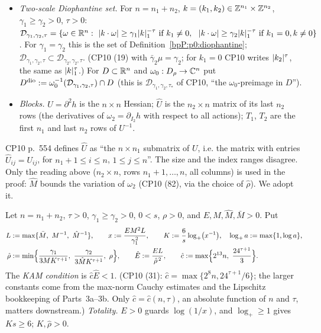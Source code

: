 \begin{itemize}
\item \emph{Two-scale Diophantine set.} For $n=n_1+n_2$, $k=(k_1,k_2)\in\mathbb{Z}^{n_1}\times\mathbb{Z}^{n_2}$, $\gamma_1\ge\gamma_2>0$, $\tau>0$:
  $\mathcal D_{\gamma_1,\gamma_2,\tau}=\{\omega\in\R^n:\ \abs{k\cdot\omega}\ge\gamma_1\abs k_1^{-\tau}\text{ if }k_1\ne0,\ \ \abs{k\cdot\omega}\ge\gamma_2\abs k_1^{-\tau}\text{ if }k_1=0,k\ne0\}$.
  For $\gamma_1=\gamma_2$ this is the set of Definition~\ref{bpP:p0:diophantine}; $\mathcal D_{\gamma_1,\gamma_2,\tau}\subset\mathcal D_{\gamma_2,\gamma_2,\tau}$.
  (CP10 (19) with $\bar\gamma_2\mu=\gamma_2$; for $k_1=0$ CP10 writes $\lvert k_2\rvert^{\tau}$, the same as $\lvert k\rvert_1^\tau$.)
  For $D\subset\mathbb{R}^n$ and $\omega_0:D_\rho\to\mathbb{C}^n$ put $D^{\rm dio}:=\omega_0^{-1}(\mathcal D_{\gamma_1,\gamma_2,\tau})\cap D$ (this is $\mathcal D_{\gamma_1,\gamma_2,\tau_*}$ of CP10, ``the $\omega_0$-preimage in $D$'').
\item \emph{Blocks.} $U=\partial^2h$ is the $n\times n$ Hessian; $\hat U$ is the $n_2\times n$ matrix of its last $n_2$ rows (the derivatives of $\omega_2=\partial_{I_2}h$ with
  respect to all actions); $T_1$, $T_2$ are the first $n_1$ and last $n_2$ rows of $U^{-1}$.
\end{itemize}

\begin{remark}\label{bpP:p3:rem-uhat}
CP10 p.~554 defines $\hat U$ as ``the $n\times n_1$ submatrix of $U$, i.e. the matrix with entries $\hat U_{ij}=U_{ij}$, for $n_1+1\le i\le n$, $1\le j\le n$''.
The size and the index ranges disagree. Only the reading above ($n_2\times n$, rows $n_1+1,\dots,n$, all columns) is used in the proof: $\hat M$ bounds the variation
of $\omega_2$ (CP10 (82), via the choice of $\hat\rho$). We adopt it.
\end{remark}

\begin{definition}\label{bpP:p3:constants}
Let $n=n_1+n_2$, $\tau>0$, $\gamma_1\ge\gamma_2>0$, $0<s$, $\rho>0$, and $E,M,\hat M,\bar M>0$. Put
\begin{align*}
L&:=\max\{\bar M,\ M^{-1},\ \hat M^{-1}\},\qquad x:=\frac{EM^2L}{\gamma_1^2},\qquad
K:=\frac6s\log_+\bigl(x^{-1}\bigr),\quad\log_+a:=\max\{1,\log a\},\\
\hat\rho&:=\min\Bigl\{\frac{\gamma_1}{3MK^{\tau+1}},\ \frac{\gamma_2}{3\hat MK^{\tau+1}},\ \rho\Bigr\},\qquad
\hat E:=\frac{EL}{\hat\rho^{\,2}},\qquad
\hat c:=\max\Bigl\{2^{13}n,\ \frac{24^{\tau+1}}3\Bigr\}.
\end{align*}
The \emph{KAM condition} is $\hat c\hat E<1$. (CP10 (31): $\hat c=\max\{2^8n,24^{\tau+1}/6\}$; the larger constants come from the max-norm
Cauchy estimates and the Lipschitz bookkeeping of Parts~3a--3b. Only $\hat c=\hat c(n,\tau)$, an absolute function of $n$ and $\tau$, matters downstream.)
\emph{Totality.} $E>0$ guards $\log(1/x)$, and $\log_+\ge1$ gives $Ks\ge6$; $K,\hat\rho>0$.
\end{definition}

